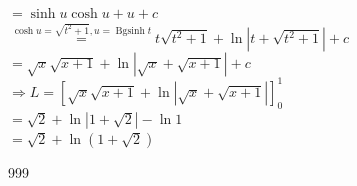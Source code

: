 \documentclass[a4paper]{article}
\begin{document}
$= \sinh u\cosh u + u + c$ \\

$\overset{\cosh u = \sqrt{t^2 + 1}, u = \operatorname{Bgsinh} t}{=} t\sqrt{t^2 + 1} + \ln |t + \sqrt{t^2 + 1}| + c$ \\

$= \sqrt{x}\sqrt{x + 1} + \ln |\sqrt{x} + \sqrt{x + 1}| + c$ \\

$\Rightarrow L = \left[\sqrt{x}\sqrt{x + 1} + \ln |\sqrt{x} + \sqrt{x + 1}|\right]_0^1$ \\

$= \sqrt{2} + \ln |1 + \sqrt{2}| - \ln 1$ \\

$= \sqrt{2} + \ln \left(1 + \sqrt{2}\right)$ \\



\begin{thebibliography}{999}
\end{thebibliography}
\end{document}
